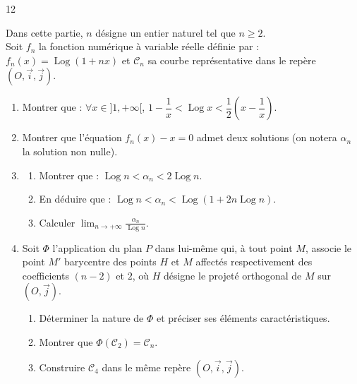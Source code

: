 \documentclass{axiobac}
\begin{document}
\begin{probleme}{12}

Dans cette partie, $n$ désigne un entier naturel tel que $n \geqslant 2$. \\
Soit $f_n$ la fonction numérique à variable réelle définie par : $f_n(x) = \operatorname{Log}(1 + nx)$ et $\mathcal{C}_n$ sa courbe représentative dans le repère $(O, \vec{i}, \vec{j})$.

\begin{enumerate}
    \item Montrer que : $\forall x \in ]1, +\infty[$, $1 - \dfrac{1}{x} < \operatorname{Log} x < \dfrac{1}{2}\left(x - \dfrac{1}{x}\right)$.
    \item Montrer que l'équation $f_n(x) - x = 0$ admet deux solutions (on notera $\alpha_n$ la solution non nulle).
    \item
    \begin{enumerate}
        \item Montrer que : $\operatorname{Log} n < \alpha_n < 2 \operatorname{Log} n$.
        \item En déduire que : $\operatorname{Log} n < \alpha_n < \operatorname{Log}(1 + 2n \operatorname{Log} n)$.
        \item Calculer $\displaystyle\lim_{n \to +\infty} \frac{\alpha_n}{\operatorname{Log} n}$.
    \end{enumerate}
    \item Soit $\Phi$ l'application du plan $P$ dans lui-même qui, à tout point $M$, associe le point $M'$ barycentre des points $H$ et $M$ affectés respectivement des coefficients $(n - 2)$ et $2$, où $H$ désigne le projeté orthogonal de $M$ sur $(O, \vec{j})$.
    \begin{enumerate}
        \item Déterminer la nature de $\Phi$ et préciser ses éléments caractéristiques.
        \item Montrer que $\Phi(\mathcal{C}_2) = \mathcal{C}_n$.
        \item Construire $\mathcal{C}_4$ dans le même repère $(O, \vec{i}, \vec{j})$.
    \end{enumerate}
\end{enumerate}

\end{probleme}
\end{document}
